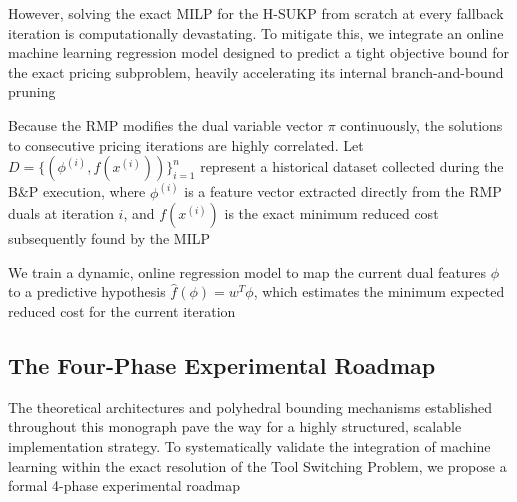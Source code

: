 \documentclass[11pt, a4paper]{book}
\begin{document}
	However, solving the exact MILP for the H-SUKP from scratch at every fallback iteration is computationally devastating. To mitigate this, we integrate an online machine learning regression model designed to predict a tight objective bound for the exact pricing subproblem, heavily accelerating its internal branch-and-bound pruning %
	
	Because the RMP modifies the dual variable vector $\pi$ continuously, the solutions to consecutive pricing iterations are highly correlated. Let $D = \{ (\phi^{(i)}, f(x^{(i)})) \}_{i=1}^n$ represent a historical dataset collected during the B\&P execution, where $\phi^{(i)}$ is a feature vector extracted directly from the RMP duals at iteration $i$, and $f(x^{(i)})$ is the exact minimum reduced cost subsequently found by the MILP %
	
	We train a dynamic, online regression model to map the current dual features $\phi$ to a predictive hypothesis $\hat{f}(\phi) = w^T \phi$, which estimates the minimum expected reduced cost for the current iteration %
	
	\subsection{The Four-Phase Experimental Roadmap}
	
	The theoretical architectures and polyhedral bounding mechanisms established throughout this monograph pave the way for a highly structured, scalable implementation strategy. To systematically validate the integration of machine learning within the exact resolution of the Tool Switching Problem, we propose a formal 4-phase experimental roadmap %
	
\end{document}
